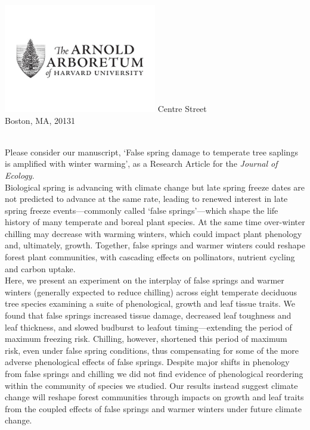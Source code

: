 \documentclass[11pt,a4paper]{article}\usepackage[]{graphicx}\usepackage[]{color}
\begin{document}
\includegraphics[width=0.5\textwidth, right]{AA_logo.jpg}
 Centre Street\\
\noindent Boston, MA, 20131\\

\vspace{1.5ex}


\vspace{3ex}\\
\noindent Please consider our manuscript, `False spring damage to temperate tree saplings is amplified with winter warming', as a Research Article for the \textit{Journal of Ecology}. \\

\noindent Biological spring is advancing with climate change but late spring freeze dates are not predicted to advance at the same rate, leading to renewed interest in late spring freeze events---commonly called `false springs'---which shape the life history of many temperate and boreal plant species. At the same time over-winter chilling may decrease with warming winters, which could impact plant phenology and, ultimately, growth. Together, false springs and warmer winters could reshape forest plant communities, with cascading effects on pollinators, nutrient cycling and carbon uptake.  \\ %

\noindent Here, we present an experiment on the interplay of false springs and warmer winters (generally expected to reduce chilling) across eight temperate deciduous tree species examining a suite of phenological, growth and leaf tissue traits. We found that false springs increased tissue damage, decreased leaf toughness and leaf thickness, and slowed budburst to leafout timing---extending the period of maximum freezing risk. Chilling, however, shortened this period of maximum risk, even under false spring conditions, thus compensating for some of the more adverse phenological effects of false springs. Despite major shifts in phenology from false springs and chilling we did not find evidence of phenological reordering within the community of species we studied. Our results instead suggest climate change will reshape forest communities through impacts on growth and leaf traits from the coupled effects of false springs and warmer winters under future climate change.\\
\end{document}
